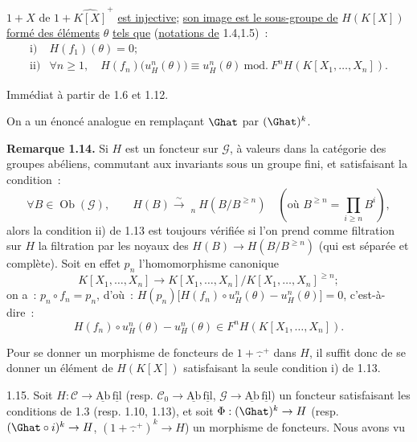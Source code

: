 
\(1+X\) de \(1+\widehat{K[X]}^+\) \uline{est injective}; \uline{son image est le sous-groupe de} \(H(K[X])\) \uline{formé des éléments} \(\theta\) \uline{tels que} (\uline{notations de} 1.4,1.5)~:
\[
\begin{array}{ll}
\text{i)}& H(f_1)(\theta)=0;\\[0.3em]
\text{ii)}& \forall n\geq1,\quad
H(f_n)\bigl(u_H^n(\theta)\bigr)\equiv u_H^n(\theta)
\ \mathrm{mod.}\ F^nH(K[X_1,\ldots,X_n]).
\end{array}
\]

Immédiat à partir de 1.6 et 1.12.

On a un énoncé analogue en remplaçant \(\Ghat\) par \((\Ghat)^k\).

\textbf{Remarque 1.14.} Si \(H\) est un foncteur sur \(\mathcal G\), à valeurs dans la catégorie des groupes abéliens, commutant aux invariants sous un groupe fini, et satisfaisant la condition~:
\[
  \forall B\in\operatorname{Ob}(\mathcal G),\qquad
  H(B)\xrightarrow{\sim}\mathop{\underleftarrow{\mathrm{Lim}}}\limits_n H(B/B^{\geq n})\quad(\text{où }B^{\geq n}=\prod_{i\geq n}B^i),
\]
alors la condition ii) de 1.13 est toujours vérifiée si l'on prend comme filtration sur \(H\) la filtration par les noyaux des \(H(B)\longrightarrow H(B/B^{\geq n})\) (qui est séparée et complète). Soit en effet \(p_n\) l'homomorphisme canonique
\[
  K[X_1,\ldots,X_n]\longrightarrow K[X_1,\ldots,X_n]/K[X_1,\ldots,X_n]^{\geq n};
\]
on a~: \(p_n\circ f_n=p_n\), d'où~: \(H(p_n)\bigl[H(f_n)\circ u_H^n(\theta)-u_H^n(\theta)\bigr]=0\), c'est-à-dire~:
\[
  H(f_n)\circ u_H^n(\theta)-u_H^n(\theta)
  \in F^nH(K[X_1,\ldots,X_n]).
\]

Pour se donner un morphisme de foncteurs de \(1+\widehat{\,\mathord{.}\,}^{+}\) dans \(H\), il suffit donc de se donner un élément de \(H(K[X])\) satisfaisant la seule condition i) de 1.13.

1.15. Soit \(H:\mathcal C\to\underline{\mathrm{Ab}}\,\underline{\mathrm{fil}}\) (resp. \(\mathcal C_0\to\underline{\mathrm{Ab}}\,\underline{\mathrm{fil}}\), \(\mathcal G\to\underline{\mathrm{Ab}}\,\underline{\mathrm{fil}}\)) un foncteur satisfaisant les conditions de 1.3 (resp. 1.10, 1.13), et soit \(\Phi:(\Ghat)^k\to H\) (resp. \((\Ghat\circ i)^k\to H\), \((1+\widehat{\,\mathord{.}\,}^{+})^k\to H\)) un morphisme de foncteurs. Nous avons vu 
